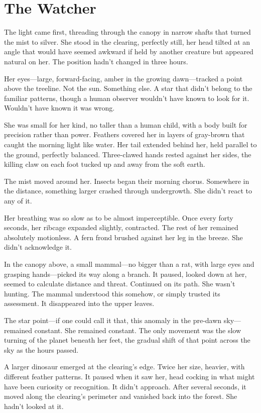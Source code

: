 \chapter{The Watcher}
\label{ch:01}


The light came first, threading through the canopy in narrow shafts that turned the mist to silver. She stood in the clearing, perfectly still, her head tilted at an angle that would have seemed awkward if held by another creature but appeared natural on her. The position hadn't changed in three hours.

Her eyes—large, forward-facing, amber in the growing dawn—tracked a point above the treeline. Not the sun. Something else. A star that didn't belong to the familiar patterns, though a human observer wouldn't have known to look for it. Wouldn't have known it was wrong.

She was small for her kind, no taller than a human child, with a body built for precision rather than power. Feathers covered her in layers of gray-brown that caught the morning light like water. Her tail extended behind her, held parallel to the ground, perfectly balanced. Three-clawed hands rested against her sides, the killing claw on each foot tucked up and away from the soft earth.

The mist moved around her. Insects began their morning chorus. Somewhere in the distance, something larger crashed through undergrowth. She didn't react to any of it.

Her breathing was so slow as to be almost imperceptible. Once every forty seconds, her ribcage expanded slightly, contracted. The rest of her remained absolutely motionless. A fern frond brushed against her leg in the breeze. She didn't acknowledge it.

In the canopy above, a small mammal—no bigger than a rat, with large eyes and grasping hands—picked its way along a branch. It paused, looked down at her, seemed to calculate distance and threat. Continued on its path. She wasn't hunting. The mammal understood this somehow, or simply trusted its assessment. It disappeared into the upper leaves.

The star point—if one could call it that, this anomaly in the pre-dawn sky—remained constant. She remained constant. The only movement was the slow turning of the planet beneath her feet, the gradual shift of that point across the sky as the hours passed.

A larger dinosaur emerged at the clearing's edge. Twice her size, heavier, with different feather patterns. It paused when it saw her, head cocking in what might have been curiosity or recognition. It didn't approach. After several seconds, it moved along the clearing's perimeter and vanished back into the forest. She hadn't looked at it.

